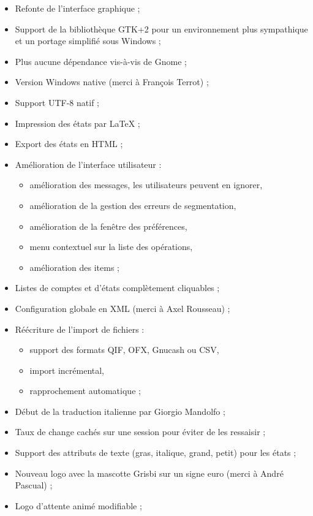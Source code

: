 \begin{itemize}
	\item Refonte de l'interface graphique ;
	\item Support de la bibliothèque GTK+2 pour un environnement plus sympathique et un portage simplifié sous Windows ;
	\item Plus aucune dépendance vis-à-vis de Gnome ;
	\item Version Windows native (merci à François Terrot) ;
	\item Support \gls{UTF-8} natif ;
	\item Impression des états par \gls{LaTeX} ;
	\item Export des états en \gls{HTML} ;
	\item Amélioration de l'interface utilisateur :
		\begin{itemize}
		\item amélioration des messages, les utilisateurs peuvent en ignorer,
		\item amélioration de la gestion des erreurs de segmentation,
		\item amélioration de la fenêtre des préférences,
		\item menu contextuel sur la liste des opérations,
		\item amélioration des items ;
		\end{itemize}
	\item Listes de comptes et d'états complètement cliquables ;
	\item Configuration globale en \gls{XML} (merci à Axel Rousseau) ;
	\item Réécriture de l'import de fichiers :
		\begin{itemize}
		\item support des formats \gls{QIF}, \gls{OFX}, \gls{Gnucash} ou \gls{CSV},
		\item import incrémental,
		\item rapprochement automatique ;
		\end{itemize}
	\item Début de la traduction italienne par Giorgio Mandolfo ;
	\item Taux de change cachés sur une session pour éviter de les
	ressaisir ;
	\item Support des attributs de texte (gras, italique, grand, petit) pour les états ;
	\item Nouveau logo avec la mascotte Grisbi sur un signe euro (merci à André Pascual) ;
	\item Logo d'attente animé modifiable ;

\end{itemize}
